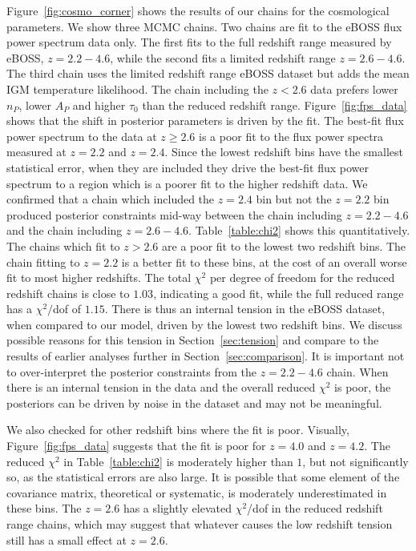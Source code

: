 Figure~\ref{fig:cosmo_corner} shows the results of our chains for the cosmological parameters.
We show three MCMC chains.
Two chains are fit to the eBOSS flux power spectrum data only.
The first fits to the full redshift range measured by eBOSS, $z=2.2 - 4.6$, while the second fits a limited redshift range $z=2.6 - 4.6$.
The third chain uses the limited redshift range eBOSS dataset but adds the mean IGM temperature likelihood.
The chain including the $z < 2.6$ data prefers lower $n_P$, lower $A_P$ and higher $\tau_0$ than the reduced redshift range.
Figure~\ref{fig:fps_data} shows that the shift in posterior parameters is driven by the fit.
The best-fit flux power spectrum to the data at $z \geq 2.6$ is a poor fit to the flux power spectra measured at $z=2.2$ and $z=2.4$.
Since the lowest redshift bins have the smallest statistical error, when they are included they drive the best-fit flux power spectrum to a region which is a poorer fit to the higher redshift data.
We confirmed that a chain which included the $z=2.4$ bin but not the $z=2.2$ bin produced posterior constraints mid-way between the chain including $z=2.2-4.6$ and the chain including $z=2.6-4.6$.
Table~\ref{table:chi2} shows this quantitatively.
The chains which fit to $z > 2.6$ are a poor fit to the lowest two redshift bins.
The chain fitting to $z=2.2$ is a better fit to these bins, at the cost of an overall worse fit to most higher redshifts.
The total $\chi^2$ per degree of freedom for the reduced redshift chains is close to $1.03$, indicating a good fit, while the full reduced range has a $\chi^2/$dof of $1.15$. 
There is thus an internal tension in the eBOSS dataset, when compared to our model, driven by the lowest two redshift bins.
We discuss possible reasons for this tension in Section~\ref{sec:tension} and compare to the results of earlier analyses further in Section~\ref{sec:comparison}.
It is important not to over-interpret the posterior constraints from the $z=2.2-4.6$ chain.
When there is an internal tension in the data and the overall reduced $\chi^2$ is poor, the posteriors can be driven by noise in the dataset and may not be meaningful.

We also checked for other redshift bins where the fit is poor.
Visually, Figure~\ref{fig:fps_data} suggests that the fit is poor for $z=4.0$ and $z=4.2$.
The reduced $\chi^2$ in Table~\ref{table:chi2} is moderately higher than $1$, but not significantly so, as the statistical errors are also large.
It is possible that some element of the covariance matrix, theoretical or systematic, is moderately underestimated in these bins.
The $z=2.6$ has a slightly elevated $\chi^2$/dof in the reduced redshift range chains, which may suggest that whatever causes the low redshift tension still has a small effect at $z=2.6$.  

